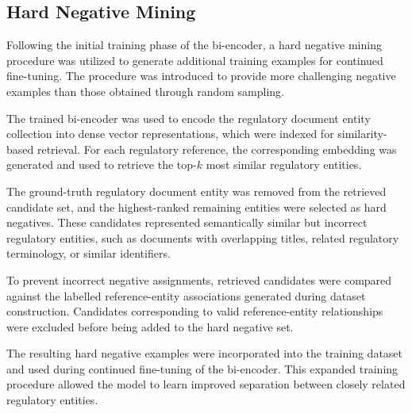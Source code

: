 \subsection{Hard Negative Mining}

Following the initial training phase of the bi-encoder, a hard negative mining procedure was utilized to generate additional training examples for continued fine-tuning. The procedure was introduced to provide more challenging negative examples than those obtained through random sampling.

The trained bi-encoder was used to encode the regulatory document entity collection into dense vector representations, which were indexed for similarity-based retrieval. For each regulatory reference, the corresponding embedding was generated and used to retrieve the top-$k$ most similar regulatory entities.

The ground-truth regulatory document entity was removed from the retrieved candidate set, and the highest-ranked remaining entities were selected as hard negatives. These candidates represented semantically similar but incorrect regulatory entities, such as documents with overlapping titles, related regulatory terminology, or similar identifiers.

To prevent incorrect negative assignments, retrieved candidates were compared against the labelled reference-entity associations generated during dataset construction. Candidates corresponding to valid reference-entity relationships were excluded before being added to the hard negative set.

The resulting hard negative examples were incorporated into the training dataset and used during continued fine-tuning of the bi-encoder. This expanded training procedure allowed the model to learn improved separation between closely related regulatory entities.